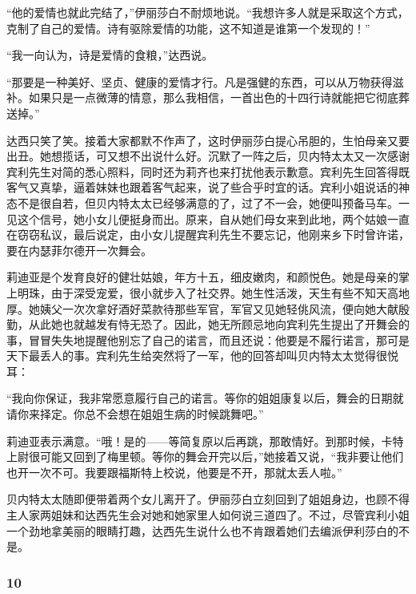 \par “他的爱情也就此完结了，”伊丽莎白不耐烦地说。“我想许多人就是采取这个方式，克制了自己的爱情。诗有驱除爱情的功能，这不知道是谁第一个发现的！”
\par “我一向认为，诗是爱情的食粮，”达西说。
\par “那要是一种美好、坚贞、健康的爱情才行。凡是强健的东西，可以从万物获得滋补。如果只是一点微薄的情意，那么我相信，一首出色的十四行诗就能把它彻底葬送掉。”
\par 达西只笑了笑。接着大家都默不作声了，这时伊丽莎白提心吊胆的，生怕母亲又要出丑。她想揽话，可又想不出说什么好。沉默了一阵之后，贝内特太太又一次感谢宾利先生对简的悉心照料，同时还为莉齐也来打扰他表示歉意。宾利先生回答得既客气又真挚，逼着妹妹也跟着客气起来，说了些合乎时宜的话。宾利小姐说话的神态不是很自若，但贝内特太太已经够满意的了，过了不一会，她便叫预备马车。一见这个信号，她小女儿便挺身而出。原来，自从她们母女来到此地，两个姑娘一直在窃窃私议，最后说定，由小女儿提醒宾利先生不要忘记，他刚来乡下时曾许诺，要在内瑟菲尔德开一次舞会。
\par 莉迪亚是个发育良好的健壮姑娘，年方十五，细皮嫩肉，和颜悦色。她是母亲的掌上明珠，由于深受宠爱，很小就步入了社交界。她生性活泼，天生有些不知天高地厚。她姨父一次次拿好酒好菜款待那些军官，军官又见她轻佻风流，便向她大献殷勤，从此她也就越发有恃无恐了。因此，她无所顾忌地向宾利先生提出了开舞会的事，冒冒失失地提醒他别忘了自己的诺言，而且还说：他要是不履行诺言，那可是天下最丢人的事。宾利先生给突然将了一军，他的回答却叫贝内特太太觉得很悦耳：
\par “我向你保证，我非常愿意履行自己的诺言。等你的姐姐康复以后，舞会的日期就请你来择定。你总不会想在姐姐生病的时候跳舞吧。”
\par 莉迪亚表示满意。“哦！是的——等简复原以后再跳，那敢情好。到那时候，卡特上尉很可能又回到了梅里顿。等你的舞会开完以后，”她接着又说，“我非要让他们也开一次不可。我要跟福斯特上校说，他要是不开，那就太丢人啦。”
\par 贝内特太太随即便带着两个女儿离开了。伊丽莎白立刻回到了姐姐身边，也顾不得主人家两姐妹和达西先生会对她和她家里人如何说三道四了。不过，尽管宾利小姐一个劲地拿美丽的眼睛打趣，达西先生说什么也不肯跟着她们去编派伊利莎白的不是。



\subsubsection*{10}

